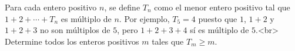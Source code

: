 Para cada entero positivo $n$, se define $T_n$ como el menor entero positivo tal que $1+2+\cdots + T_n$ es múltiplo de $n$. Por ejemplo, $T_5 = 4$ puesto que $1$, $1+2$ y $1+2+3$ no son múltiplos de $5$, pero $1+2+3+4$ sí es múltiplo de $5$.<br>
Determine todos los enteros positivos $m$ tales que $T_m \geq m$.
